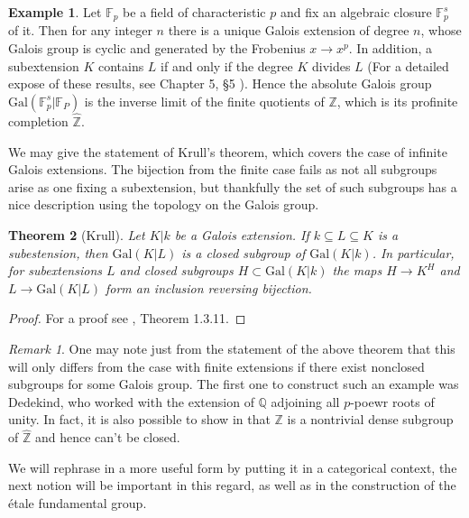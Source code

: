 \documentclass{article}
\newtheorem{theorem}{Theorem}[section]
\theoremstyle{definition}
\newtheorem{example}[theorem]{Example}
\theoremstyle{remark}
\newtheorem*{remark}{Remark}
\theoremstyle{plain}
\newcommand{\Z}{\mathbb{Z}}
\newcommand{\Q}{\mathbb{Q}}
\begin{document}
\begin{example}
	Let $\mathbb{F}_p$ be a field of characteristic $p$ and fix an algebraic closure $\mathbb{F}_p^s$ of it.
	Then for any integer $n$ there is a unique Galois extension of degree $n$, whose Galois group is cyclic and generated by the Frobenius $x \to x^p$.
	In addition, a subextension $K$ contains $L$ if and only if the degree $K$ divides $L$ (For a detailed expose of these results, see Chapter 5, \S 5 \cite{langalgebra}).
	Hence the absolute Galois group $\text{Gal}(\mathbb{F}_p^s| \mathbb{F}_P)$ is the inverse limit of the finite quotients of $\Z$, which is its profinite completion $\widehat{\Z}$.
	

\end{example}
We may give the statement of Krull's theorem, which covers the case of infinite Galois extensions.
The bijection from the finite case fails as not all subgroups arise as one fixing a subextension, but thankfully the set of such subgroups has a nice description using the topology on the Galois group.
\begin{theorem}[Krull]
	Let $K | k$ be a Galois extension.
	If $k \subseteq L \subseteq K$ is a subestension, then $\text{Gal}(K|L)$ is a closed subgroup of $\text{Gal}(K|k)$.
	In particular, for subextensions $L$ and closed subgroups $H \subset \text{Gal}(K|k)$ the maps $H \to K^H$ and $L \to \text{Gal}(K|L)$ form an inclusion reversing bijection.
\end{theorem}

\begin{proof}
	For a proof see \cite{Szamuely}, Theorem 1.3.11. 
\end{proof}


\begin{remark}
	One may note just from the statement of the above theorem that this will only differs from the case with finite extensions if there exist nonclosed subgroups for some Galois group.
	The first one to construct such an example was Dedekind, who worked with the extension of $\Q$ adjoining all $p$-poewr roots of unity.
	In fact, it is also possible to show in   that $\Z$ is a nontrivial dense subgroup of $\widehat{\Z}$ and hence can't be closed.
\end{remark}

We will rephrase  in a more useful form by putting it in a categorical context, the next notion will be important in this regard, as well as in the construction of the \'etale fundamental group.
\end{document}
